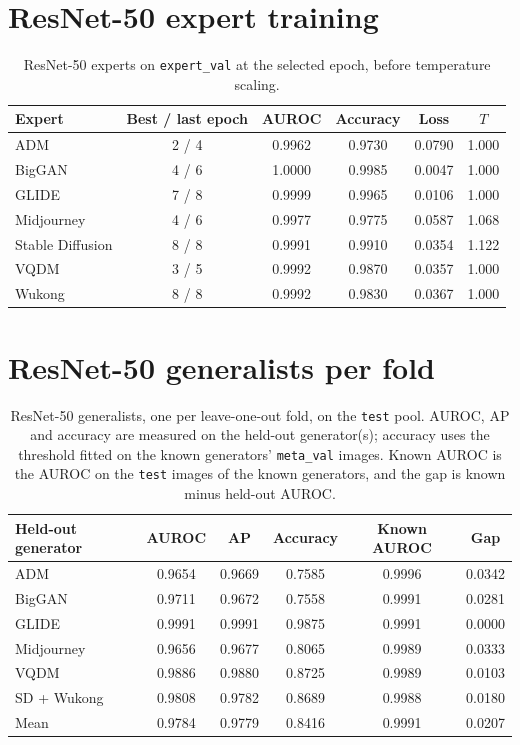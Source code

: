 \documentclass[10pt,a4paper]{article}
\begin{document}
\section{ResNet-50 expert training}\label{app:resnet}
\begin{table}[H]
\centering
\small
\begin{tabular}{lccccc}
\toprule
Expert & Best / last epoch & AUROC & Accuracy & Loss & $T$ \\
\midrule
ADM        & 2 / 4 & 0.9962 & 0.9730 & 0.0790 & 1.000 \\
BigGAN     & 4 / 6 & 1.0000 & 0.9985 & 0.0047 & 1.000 \\
GLIDE      & 7 / 8 & 0.9999 & 0.9965 & 0.0106 & 1.000 \\
Midjourney & 4 / 6 & 0.9977 & 0.9775 & 0.0587 & 1.068 \\
Stable Diffusion & 8 / 8 & 0.9991 & 0.9910 & 0.0354 & 1.122 \\
VQDM       & 3 / 5 & 0.9992 & 0.9870 & 0.0357 & 1.000 \\
Wukong     & 8 / 8 & 0.9992 & 0.9830 & 0.0367 & 1.000 \\
\bottomrule
\end{tabular}
\caption{ResNet-50 experts on \texttt{expert\_val} at the selected epoch, before temperature scaling.}
\label{tab:resnet-experts}
\end{table}

\section{ResNet-50 generalists per fold}\label{app:generalists}
\begin{table}[H]
\centering
\small
\begin{tabular}{lccccc}
\toprule
Held-out generator & AUROC & AP & Accuracy & Known AUROC & Gap \\
\midrule
ADM              & 0.9654 & 0.9669 & 0.7585 & 0.9996 & 0.0342 \\
BigGAN           & 0.9711 & 0.9672 & 0.7558 & 0.9991 & 0.0281 \\
GLIDE            & 0.9991 & 0.9991 & 0.9875 & 0.9991 & 0.0000 \\
Midjourney       & 0.9656 & 0.9677 & 0.8065 & 0.9989 & 0.0333 \\
VQDM             & 0.9886 & 0.9880 & 0.8725 & 0.9989 & 0.0103 \\
SD + Wukong      & 0.9808 & 0.9782 & 0.8689 & 0.9988 & 0.0180 \\
\midrule
Mean             & 0.9784 & 0.9779 & 0.8416 & 0.9991 & 0.0207 \\
\bottomrule
\end{tabular}
\caption{ResNet-50 generalists, one per leave-one-out fold, on the \texttt{test} pool. AUROC, AP and accuracy are measured on the held-out generator(s); accuracy uses the threshold fitted on the known generators' \texttt{meta\_val} images. Known AUROC is the AUROC on the \texttt{test} images of the known generators, and the gap is known minus held-out AUROC.}
\label{tab:generalists}
\end{table}
\end{document}
